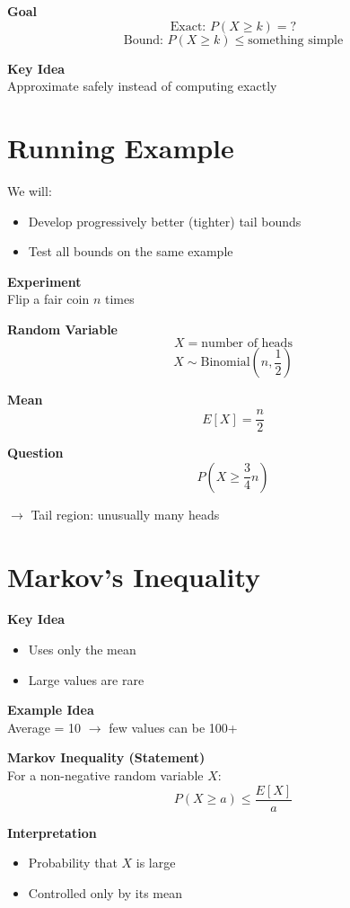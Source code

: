 \documentclass[12pt]{article}
\begin{document}
\textbf{Goal}
\[
\text{Exact: } P(X \geq k) = ?
\]
\[
\text{Bound: } P(X \geq k) \leq \text{something simple}
\]

\textbf{Key Idea}\\
Approximate safely instead of computing exactly

\section{Running Example}

We will:
\begin{itemize}
    \item Develop progressively better (tighter) tail bounds
    \item Test all bounds on the same example
\end{itemize}

\textbf{Experiment}\\
Flip a fair coin $n$ times

\textbf{Random Variable}
\[
X = \text{number of heads}
\]
\[
X \sim \text{Binomial}\left(n, \frac{1}{2}\right)
\]

\textbf{Mean}
\[
E[X] = \frac{n}{2}
\]

\textbf{Question}
\[
P\left(X \geq \frac{3}{4}n\right)
\]

$\rightarrow$ Tail region: unusually many heads

\section{Markov’s Inequality}

\textbf{Key Idea}
\begin{itemize}
    \item Uses only the mean
    \item Large values are rare
\end{itemize}

\textbf{Example Idea}\\
Average = 10 $\rightarrow$ few values can be 100+

\textbf{Markov Inequality (Statement)}\\
For a non-negative random variable $X$:
\[
P(X \geq a) \leq \frac{E[X]}{a}
\]

\textbf{Interpretation}
\begin{itemize}
    \item Probability that $X$ is large
    \item Controlled only by its mean
\end{itemize}
\end{document}
